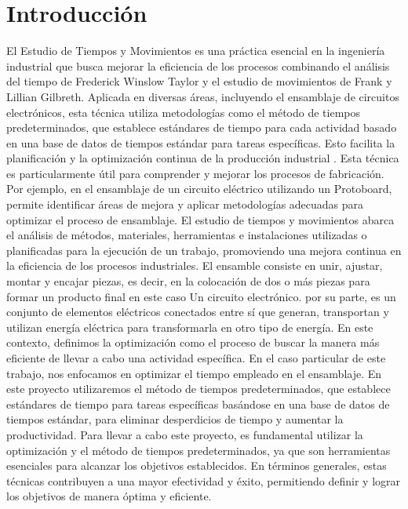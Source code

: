     \section{Introducción}
    El Estudio de Tiempos y Movimientos es una práctica esencial en la ingeniería industrial que busca mejorar la eficiencia de los procesos combinando el análisis del tiempo de Frederick Winslow Taylor y el estudio de movimientos de Frank y Lillian Gilbreth. \cite{andrade2019estudio} Aplicada en diversas áreas, incluyendo el ensamblaje de circuitos electrónicos, esta técnica utiliza metodologías como el método de tiempos predeterminados, que establece estándares de tiempo para cada actividad basado en una base de datos de tiempos estándar para tareas específicas. Esto facilita la planificación y la optimización continua de la producción industrial \cite{Niebel}.
    Esta técnica es particularmente útil para comprender y mejorar los procesos de fabricación. Por ejemplo, en el ensamblaje de un circuito eléctrico utilizando un Protoboard, permite identificar áreas de mejora y aplicar metodologías adecuadas para optimizar el proceso de ensamblaje. El estudio de tiempos y movimientos abarca el análisis de métodos, materiales, herramientas e instalaciones utilizadas o planificadas para la ejecución de un trabajo, promoviendo una mejora continua en la eficiencia de los procesos industriales.
    El ensamble consiste en unir, ajustar, montar y encajar piezas, es decir, en la colocación de dos o más piezas para formar un producto final en este caso Un circuito electrónico.
    por su parte, es un conjunto de elementos eléctricos conectados entre sí que generan, transportan y utilizan energía eléctrica para transformarla en otro tipo de energía.
    En este contexto, definimos la optimización como el proceso de buscar la manera más eficiente de llevar a cabo una actividad específica. En el caso particular de este trabajo, nos enfocamos en optimizar el tiempo empleado en el ensamblaje. \cite{RAE}
    En este proyecto utilizaremos el método de tiempos predeterminados, que establece estándares de tiempo para tareas específicas basándose en una base de datos de tiempos estándar, para eliminar desperdicios de tiempo y aumentar la productividad.
    Para llevar a cabo este proyecto, es fundamental utilizar la optimización y el método de tiempos predeterminados, ya que son herramientas esenciales para alcanzar los objetivos establecidos. En términos generales, estas técnicas contribuyen a una mayor efectividad y éxito, permitiendo definir y lograr los objetivos de manera óptima y eficiente. \cite{Niebel}
    
